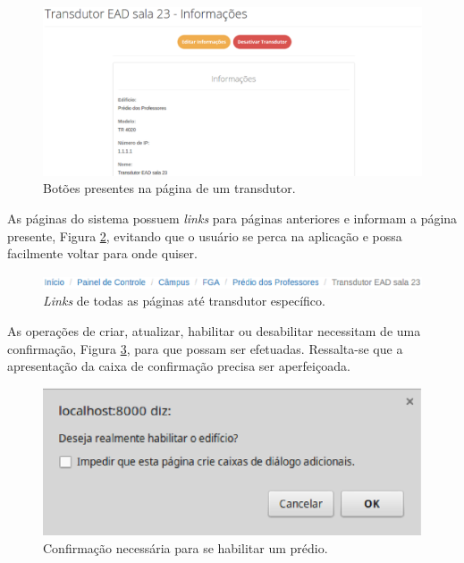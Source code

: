 \begin{figure}[!h]
    \centering
    \includegraphics[scale=0.4]{figuras/buttons_2.eps}
    \caption{Botões presentes na página de um transdutor.}
    \label{buttons_2}
\end{figure}

As páginas do sistema possuem \textit{links} para páginas anteriores e informam a página presente, Figura \ref{links}, evitando que o usuário se perca na aplicação e possa facilmente voltar para onde quiser.

\begin{figure}[!h]
    \centering
    \includegraphics[scale=0.7]{figuras/links.eps}
    \caption{\textit{Links} de todas as páginas até transdutor específico.}
    \label{links}
\end{figure}

As operações de criar, atualizar, habilitar ou desabilitar necessitam de uma confirmação, Figura \ref{block}, para que possam ser efetuadas. Ressalta-se que a apresentação da caixa de confirmação precisa ser aperfeiçoada.

\begin{figure}[!h]
    \centering
    \includegraphics[scale=0.7]{figuras/block.eps}
    \caption{Confirmação necessária para se habilitar um prédio.}
    \label{block}
\end{figure}

